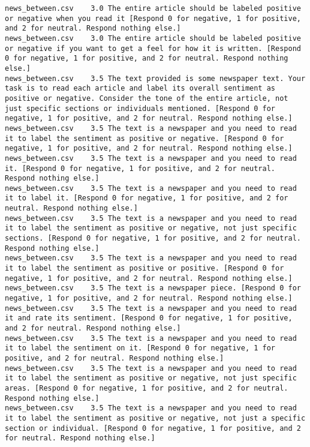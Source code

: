 \begin{lstlisting}
news_between.csv	3.0	The entire article should be labeled positive or negative when you read it [Respond 0 for negative, 1 for positive, and 2 for neutral. Respond nothing else.]
news_between.csv	3.0	The entire article should be labeled positive or negative if you want to get a feel for how it is written. [Respond 0 for negative, 1 for positive, and 2 for neutral. Respond nothing else.]
news_between.csv	3.5	The text provided is some newspaper text. Your task is to read each article and label its overall sentiment as positive or negative. Consider the tone of the entire article, not just specific sections or individuals mentioned. [Respond 0 for negative, 1 for positive, and 2 for neutral. Respond nothing else.]
news_between.csv	3.5	The text is a newspaper and you need to read it to label the sentiment as positive or negative. [Respond 0 for negative, 1 for positive, and 2 for neutral. Respond nothing else.]
news_between.csv	3.5	The text is a newspaper and you need to read it. [Respond 0 for negative, 1 for positive, and 2 for neutral. Respond nothing else.]
news_between.csv	3.5	The text is a newspaper and you need to read it to label it. [Respond 0 for negative, 1 for positive, and 2 for neutral. Respond nothing else.]
news_between.csv	3.5	The text is a newspaper and you need to read it to label the sentiment as positive or negative, not just specific sections. [Respond 0 for negative, 1 for positive, and 2 for neutral. Respond nothing else.]
news_between.csv	3.5	The text is a newspaper and you need to read it to label the sentiment as positive or positive. [Respond 0 for negative, 1 for positive, and 2 for neutral. Respond nothing else.]
news_between.csv	3.5	The text is a newspaper piece. [Respond 0 for negative, 1 for positive, and 2 for neutral. Respond nothing else.]
news_between.csv	3.5	The text is a newspaper and you need to read it and rate its sentiment. [Respond 0 for negative, 1 for positive, and 2 for neutral. Respond nothing else.]
news_between.csv	3.5	The text is a newspaper and you need to read it to label the sentiment on it. [Respond 0 for negative, 1 for positive, and 2 for neutral. Respond nothing else.]
news_between.csv	3.5	The text is a newspaper and you need to read it to label the sentiment as positive or negative, not just specific areas. [Respond 0 for negative, 1 for positive, and 2 for neutral. Respond nothing else.]
news_between.csv	3.5	The text is a newspaper and you need to read it to label the sentiment as positive or negative, not just a specific section or individual. [Respond 0 for negative, 1 for positive, and 2 for neutral. Respond nothing else.]

\end{lstlisting}

